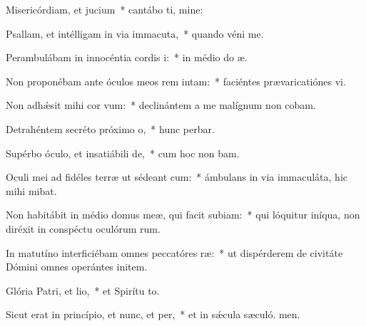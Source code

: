 \item Misericórdiam, et jucium~* cantábo ti, mine:
\item Psallam, et intélligam in via immacuta,~* quando véni  me.
\item Perambulábam in innocéntia cordis i:~* in médio do æ.
\item Non proponébam ante óculos meos rem intam:~* faciéntes prævaricatiónes vi.
\item Non adhǽsit mihi cor vum:~* declinántem a me malígnum non cobam.
\item Detrahéntem secréto próximo o,~* hunc perbar.
\item Supérbo óculo, et insatiábili de,~* cum hoc non bam.
\item Oculi mei ad fidéles terræ ut sédeant cum:~* ámbulans in via immaculáta, hic mihi mibat.
\item Non habitábit in médio domus meæ, qui facit subiam:~* qui lóquitur iníqua, non diréxit in conspéctu oculórum rum.
\item In matutíno interficiébam omnes peccatóres ræ:~* ut dispérderem de civitáte Dómini omnes operántes initem.
\item Glória Patri, et lio,~* et Spirítu to.
\item Sicut erat in princípio, et nunc, et per,~* et in sǽcula sæculó. men.
